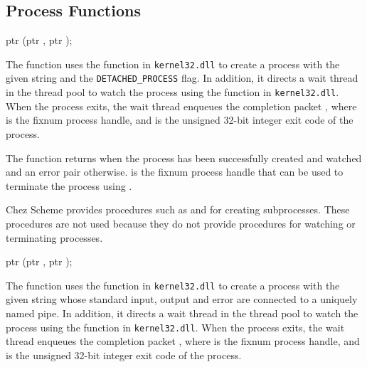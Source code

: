 \subsection {Process Functions}

\begin{function}
  ptr (ptr , ptr );
\end{function}\antipar

The  function uses the
 function in \texttt{kernel32.dll} to create a
process with the given  string and the
\texttt{DETACHED\_PROCESS} flag.  In addition, it directs a wait
thread in the thread pool to watch the process using the
 function in
\texttt{kernel32.dll}.  When the process exits, the wait thread
enqueues the completion packet , where  is the fixnum process handle,
and  is the unsigned 32-bit integer exit code of the
process.

The  function returns
 when the process has been successfully created and
watched and an error pair otherwise.   is the fixnum
process handle that can be used to terminate the process using
.

Chez Scheme provides procedures such as  and
 for creating subprocesses. These procedures are not
used because they do not provide procedures for watching or
terminating processes.

\begin{function}
  ptr (ptr , ptr );
\end{function}\antipar

The  function uses the
 function in \texttt{kernel32.dll} to create a
process with the given  string whose standard input,
output and error are connected to a uniquely named pipe.  In addition,
it directs a wait thread in the thread pool to watch the process using
the  function in
\texttt{kernel32.dll}.  When the process exits, the wait thread
enqueues the completion packet , where  is the fixnum process handle,
and  is the unsigned 32-bit integer exit code of the
process.

